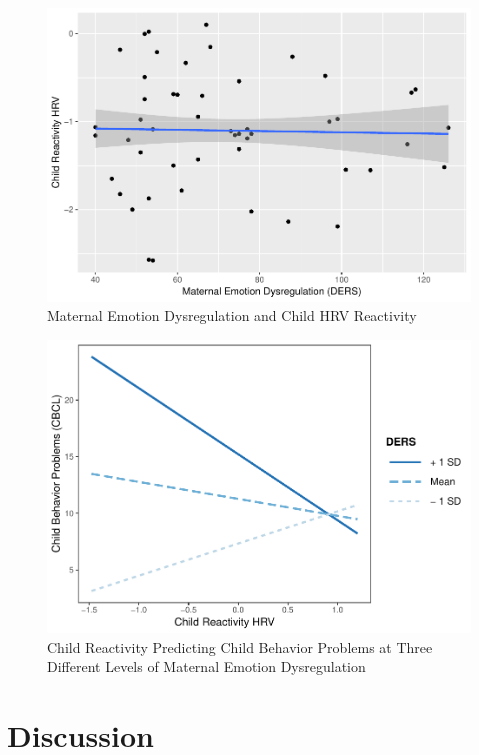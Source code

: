 \documentclass[man]{apa6}
\begin{document}
\begin{figure}
\centering
\includegraphics{DataPrepScript_apa_style_files/figure-latex/plot2-1.pdf}
\caption{\label{fig:plot2}Maternal Emotion Dysregulation and Child HRV
Reactivity}
\end{figure}

\begin{figure}
\centering
\includegraphics{DataPrepScript_apa_style_files/figure-latex/plot3-1.pdf}
\caption{\label{fig:plot3}Child Reactivity Predicting Child Behavior
Problems at Three Different Levels of Maternal Emotion Dysregulation}
\end{figure}

\section{Discussion}\label{discussion}
\end{document}
